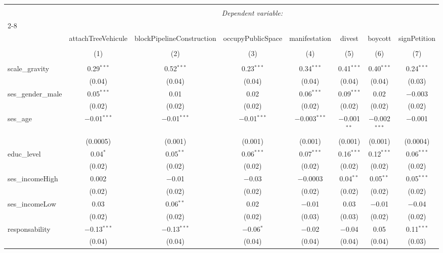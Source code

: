 \documentclass[
]{article}
\begin{document}
\begin{sidewaystable}[!htbp] \centering 
  \caption{Sans interaction 2} 
  \label{} 
\begin{tabular}{@{\extracolsep{1pt}}lccccccc} 
\\[-1.8ex]\hline 
\hline \\[-1.8ex] 
 & \multicolumn{7}{c}{\textit{Dependent variable:}} \\ 
\cline{2-8} 
\\[-1.8ex] & attachTreeVehicule & blockPipelineConstruction & occupyPublicSpace & manifestation & divest & boycott & signPetition \\ 
\\[-1.8ex] & (1) & (2) & (3) & (4) & (5) & (6) & (7)\\ 
\hline \\[-1.8ex] 
 scale\_gravity & 0.29$^{***}$ & 0.52$^{***}$ & 0.23$^{***}$ & 0.34$^{***}$ & 0.41$^{***}$ & 0.40$^{***}$ & 0.24$^{***}$ \\ 
  & (0.04) & (0.04) & (0.04) & (0.04) & (0.04) & (0.04) & (0.03) \\ 
  ses\_gender\_male & 0.05$^{***}$ & 0.01 & 0.02 & 0.06$^{***}$ & 0.09$^{***}$ & 0.02 & $-$0.003 \\ 
  & (0.02) & (0.02) & (0.02) & (0.02) & (0.02) & (0.02) & (0.02) \\ 
  ses\_age & $-$0.01$^{***}$ & $-$0.01$^{***}$ & $-$0.01$^{***}$ & $-$0.003$^{***}$ & $-$0.001$^{**}$ & $-$0.002$^{***}$ & $-$0.001 \\ 
  & (0.0005) & (0.001) & (0.001) & (0.001) & (0.001) & (0.001) & (0.0004) \\ 
  educ\_level & 0.04$^{*}$ & 0.05$^{**}$ & 0.06$^{***}$ & 0.07$^{***}$ & 0.16$^{***}$ & 0.12$^{***}$ & 0.06$^{***}$ \\ 
  & (0.02) & (0.02) & (0.02) & (0.02) & (0.02) & (0.02) & (0.02) \\ 
  ses\_incomeHigh & 0.002 & $-$0.01 & $-$0.03 & $-$0.0003 & 0.04$^{**}$ & 0.05$^{**}$ & 0.05$^{***}$ \\ 
  & (0.02) & (0.02) & (0.02) & (0.02) & (0.02) & (0.02) & (0.02) \\ 
  ses\_incomeLow & 0.03 & 0.06$^{**}$ & 0.02 & $-$0.01 & 0.03 & $-$0.01 & $-$0.04 \\ 
  & (0.02) & (0.02) & (0.02) & (0.03) & (0.03) & (0.02) & (0.02) \\ 
  responsability & $-$0.13$^{***}$ & $-$0.13$^{***}$ & $-$0.06$^{*}$ & $-$0.02 & $-$0.04 & 0.05 & 0.11$^{***}$ \\ 
  & (0.04) & (0.04) & (0.04) & (0.04) & (0.04) & (0.04) & (0.03) \\ 

\end{tabular}
\end{sidewaystable}
\end{document}

